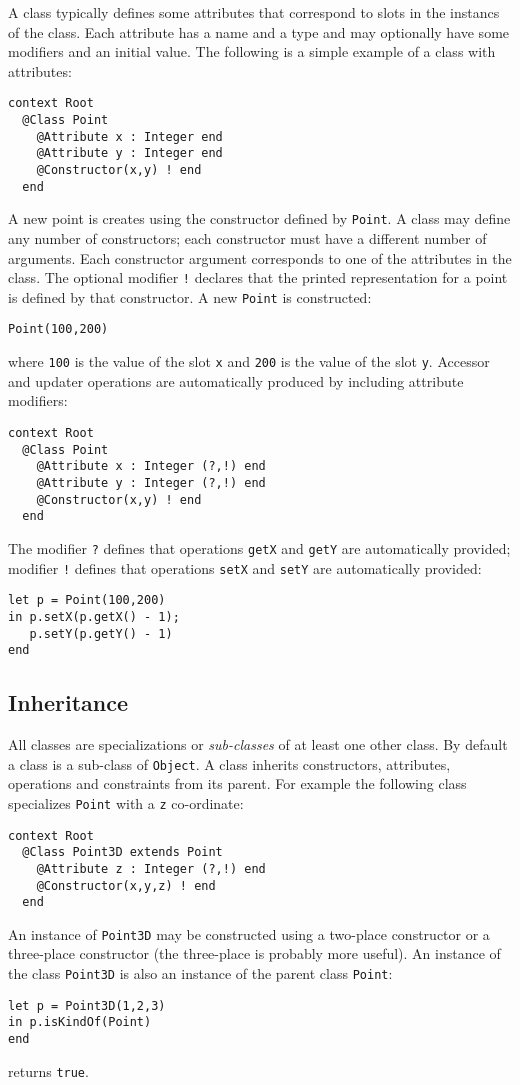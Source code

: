 \documentclass{article}
\begin{document}
A class typically defines some attributes that correspond to slots in the instancs of the class.
Each attribute has a name and a type and may optionally have some modifiers and an initial value.
The following is a simple example of a class with attributes:
\begin{verbatim}
context Root
  @Class Point 
    @Attribute x : Integer end
    @Attribute y : Integer end
    @Constructor(x,y) ! end
  end
\end{verbatim}
A new point is creates using the constructor defined by {\tt Point}. A class may define any number of
constructors; each constructor must have a different number of arguments. Each constructor argument
corresponds to one of the attributes in the class. The optional modifier {\tt !} declares that the
printed representation for a point is defined by that constructor.
A new {\tt Point} is constructed:
\begin{verbatim}
Point(100,200)
\end{verbatim}
where {\tt 100} is the value of the slot {\tt x} and {\tt 200} is the value of the slot {\tt y}.
Accessor and updater operations are automatically produced by including attribute modifiers:
\begin{verbatim}
context Root
  @Class Point 
    @Attribute x : Integer (?,!) end
    @Attribute y : Integer (?,!) end
    @Constructor(x,y) ! end
  end
\end{verbatim}
The modifier {\tt ?} defines that operations {\tt getX} and {\tt getY} are automatically provided;
modifier {\tt !} defines that operations {\tt setX} and {\tt setY} are automatically provided:
\begin{verbatim}
let p = Point(100,200)
in p.setX(p.getX() - 1);
   p.setY(p.getY() - 1)
end
\end{verbatim}

\subsection{Inheritance}

All classes are specializations or {\em sub-classes} of at least one other class. By default
a class is a sub-class of {\tt Object}. A class inherits constructors, attributes, operations
and constraints from its parent. For example the following class specializes {\tt Point}
with a {\tt z} co-ordinate:
\begin{verbatim}
context Root
  @Class Point3D extends Point
    @Attribute z : Integer (?,!) end
    @Constructor(x,y,z) ! end
  end
\end{verbatim}
An instance of {\tt Point3D} may be constructed using a two-place constructor or a three-place 
constructor (the three-place is probably more useful). An instance of the class {\tt Point3D} is
also an instance of the parent class {\tt Point}:
\begin{verbatim}
let p = Point3D(1,2,3)
in p.isKindOf(Point)
end
\end{verbatim}
returns {\tt true}.
\end{document}
